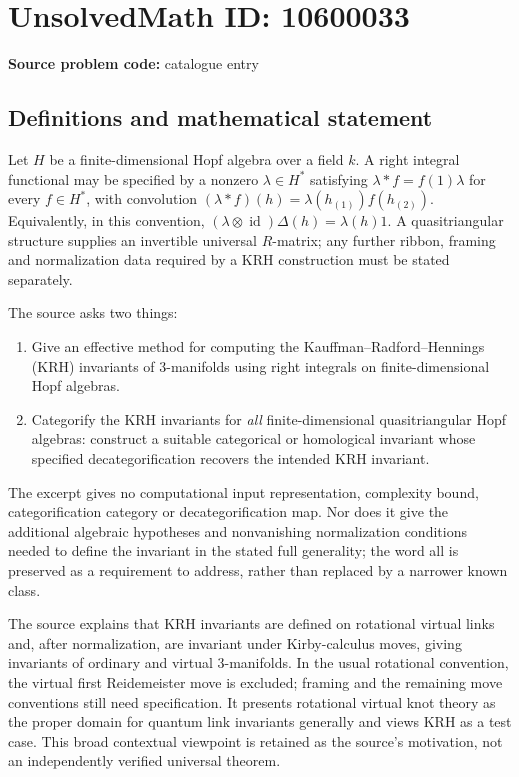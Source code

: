 \documentclass[11pt]{article}
\begin{document}
\section*{UnsolvedMath ID: 10600033}
\textbf{Source problem code:} catalogue entry
\subsection{Definitions and mathematical statement}
Let \(H\) be a finite-dimensional Hopf algebra over a field \(k\). A right integral functional may be specified by a nonzero \(\lambda\in H^*\) satisfying \(\lambda*f=f(1)\lambda\) for every \(f\in H^*\), with convolution \((\lambda*f)(h)=\lambda(h_{(1)})f(h_{(2)})\). Equivalently, in this convention, \((\lambda\otimes\operatorname{id})\Delta(h)=\lambda(h)1\). A quasitriangular structure supplies an invertible universal \(R\)-matrix; any further ribbon, framing and normalization data required by a KRH construction must be stated separately.

The source asks two things:
\begin{enumerate}
\item Give an effective method for computing the Kauffman--Radford--Hennings (KRH) invariants of \(3\)-manifolds using right integrals on finite-dimensional Hopf algebras.
\item Categorify the KRH invariants for \emph{all} finite-dimensional quasitriangular Hopf algebras: construct a suitable categorical or homological invariant whose specified decategorification recovers the intended KRH invariant.
\end{enumerate}
The excerpt gives no computational input representation, complexity bound, categorification category or decategorification map. Nor does it give the additional algebraic hypotheses and nonvanishing normalization conditions needed to define the invariant in the stated full generality; the word all is preserved as a requirement to address, rather than replaced by a narrower known class.

The source explains that KRH invariants are defined on rotational virtual links and, after normalization, are invariant under Kirby-calculus moves, giving invariants of ordinary and virtual \(3\)-manifolds. In the usual rotational convention, the virtual first Reidemeister move is excluded; framing and the remaining move conventions still need specification. It presents rotational virtual knot theory as the proper domain for quantum link invariants generally and views KRH as a test case. This broad contextual viewpoint is retained as the source's motivation, not an independently verified universal theorem.
\end{document}
